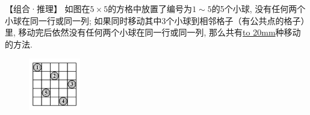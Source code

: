 \item {
    【组合·推理】
    如图在$5\times 5$的方格中放置了编号为$1\sim 5$的5个小球, 没有任何两个小球在同一行或同一列; 如果同时移动其中3个小球到相邻格子（有公共点的格子）里, 移动完后依然没有任何两个小球在同一行或同一列, 那么共有\underline{\hbox to 20mm{}}种移动的方法.
    \begin{figure}[H] 
        \centering
        \includegraphics[width=0.2\textwidth]{./pics/Chapter_4/23.png}
    \end{figure}
}
